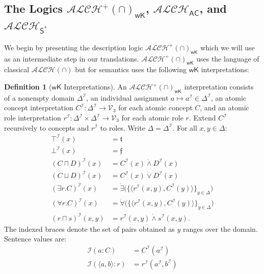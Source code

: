 \documentclass[letterpaper]{article} %
\theoremstyle{definition}
\theoremstyle{definition}
\newtheorem{definition}{Definition}
\theoremstyle{definition}
\theoremstyle{definition}
\theoremstyle{definition}
\newcommand{\isa}{\mathbin{{:}}}
\newcommand{\vt}{\mathfrak{t}}
\newcommand{\vf}{\mathfrak{f}}
\begin{document}
\subsection{The Logics $\mathcal{ALCH^+(\cap)}_\mathsf{wK}$, $\mathcal{ALCH}_\mathsf{AC}$, and $\mathcal{ALCH}_{\mathsf{S}^*}$}

We begin by presenting the description logic  $\mathcal{ALCH^+(\cap)}_\mathsf{wK}$ which we will use as an intermediate step in our translations. $\mathcal{ALCH^+(\cap)}_\mathsf{wK}$ uses the language of classical $\mathcal{ALCH(\cap)}$ but for semantics uses the following $\mathsf{wK}$ interpretations:

\begin{definition}[$\mathsf{wK}$ Interpretations]\label{def:wK-Interp}
An $\mathcal{ALCH^+(\cap)}_\mathsf{wK}$ interpretation consists of a nonempty domain $\Delta^{\mathcal{I}}$, an individual assignment $a\mapsto a^{\mathcal{I}}\in\Delta^{\mathcal{I}}$, an atomic concept interpretation $C^{\mathcal{I}}:\Delta^{\mathcal{I}}\to\mathcal{V}_{3}$ for each atomic concept $C$, and an atomic role interpretation $r^{\mathcal{I}}:\Delta^{\mathcal{I}}\times\Delta^{\mathcal{I}}\to\mathcal{V}_{3}$ for each atomic role $r$. Extend $C^{\mathcal{I}}$ recursively to concepts and $r^{\mathcal{I}}$ to roles. Write $\Delta=\Delta^{\mathcal{I}}$. For all $x,y\in\Delta$:
\begin{align*}
\top^{\mathcal{I}}(x)&=\vt\\
\bot^{\mathcal{I}}(x)&=\vf\\
(C\sqcap D)^{\mathcal{I}}(x)&=C^{\mathcal{I}}(x)\mathrel{\dot{\wedge}}D^{\mathcal{I}}(x)\\
(C\sqcup D)^{\mathcal{I}}(x)&=C^{\mathcal{I}}(x)\mathrel{\dot{\vee}}D^{\mathcal{I}}(x)\\
(\exists r.C)^{\mathcal{I}}(x)&=\dot{\exists}\bigl(\{\langle r^{\mathcal{I}}(x,y),C^{\mathcal{I}}(y)\rangle\}_{y\in\Delta}\bigr)\\
(\forall r.C)^{\mathcal{I}}(x)&=\dot{\forall}\bigl(\{\langle r^{\mathcal{I}}(x,y),C^{\mathcal{I}}(y)\rangle\}_{y\in\Delta}\bigr)\\
(r\sqcap s)^{\mathcal{I}}(x,y)&=r^{\mathcal{I}}(x,y)\mathrel{\dot{\wedge}}s^{\mathcal{I}}(x,y).
\end{align*}
The indexed braces denote the set of pairs obtained as $y$ ranges over the domain. Sentence values are:
\begin{align*}
\mathcal{I}(a\isa C)&=C^{\mathcal{I}}(a^{\mathcal{I}})\\
\mathcal{I}(\langle a,b\rangle\isa r)&=r^{\mathcal{I}}(a^{\mathcal{I}},b^{\mathcal{I}})\\

\end{align*}
\end{definition}
\end{document}

